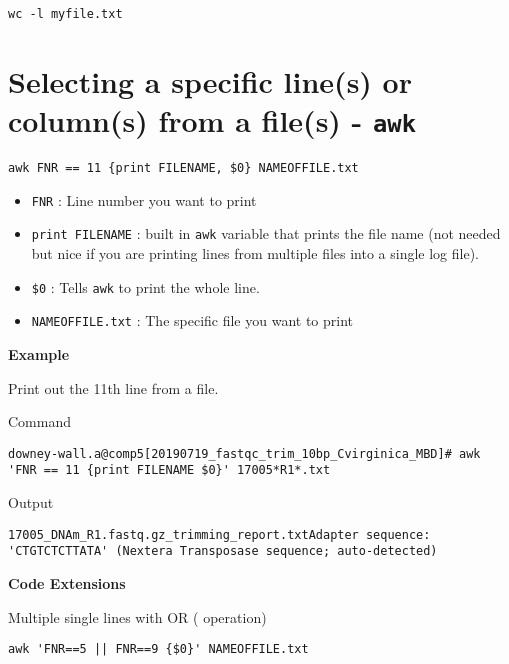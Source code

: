 \documentclass[
  letterpaper,
  DIV=11,
  numbers=noendperiod]{scrreprt}
\begin{document}
\begin{verbatim}
wc -l myfile.txt
\end{verbatim}

\hypertarget{selecting-a-specific-lines-or-columns-from-a-files---awk}{%
\section*{\texorpdfstring{\textbf{Selecting a specific line(s) or
column(s) from a file(s) -
\texttt{awk}}}{Selecting a specific line(s) or column(s) from a file(s) - awk}}\label{selecting-a-specific-lines-or-columns-from-a-files---awk}}

\texttt{awk\ \textquotesingle{}FNR\ ==\ 11\ \{print\ FILENAME,\ \$0\}\textquotesingle{}\ NAMEOFFILE.txt}

\begin{itemize}
\item
  \texttt{FNR} : Line number you want to print
\item
  \texttt{print\ FILENAME} : built in \texttt{awk} variable that prints
  the file name (not needed but nice if you are printing lines from
  multiple files into a single log file).
\item
  \texttt{\$0} : Tells \texttt{awk} to print the whole line.
\item
  \texttt{NAMEOFFILE.txt} : The specific file you want to print
\end{itemize}

\textbf{Example}

Print out the 11th line from a file.

Command

\begin{verbatim}
downey-wall.a@comp5[20190719_fastqc_trim_10bp_Cvirginica_MBD]# awk 'FNR == 11 {print FILENAME $0}' 17005*R1*.txt 
\end{verbatim}

Output

\begin{verbatim}
17005_DNAm_R1.fastq.gz_trimming_report.txtAdapter sequence: 'CTGTCTCTTATA' (Nextera Transposase sequence; auto-detected)
\end{verbatim}

\textbf{Code Extensions}

Multiple single lines with OR (\texttt{\textbar{}\textbar{}} operation)

\begin{verbatim}
awk 'FNR==5 || FNR==9 {$0}' NAMEOFFILE.txt
\end{verbatim}
\end{document}
